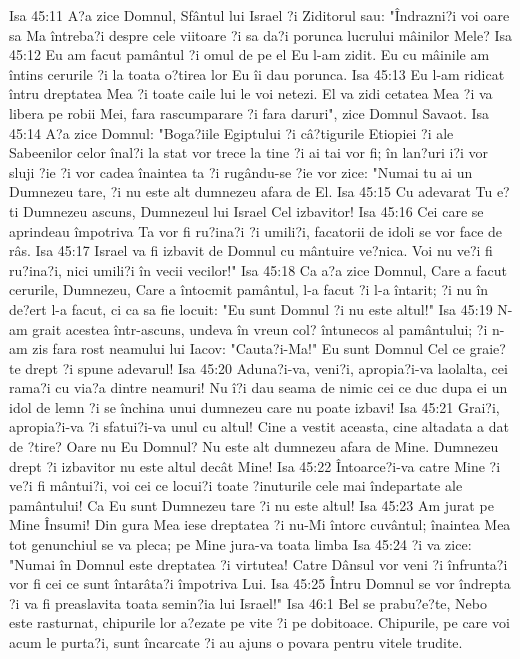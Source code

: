 Isa 45:11  A?a zice Domnul, Sfântul lui Israel ?i Ziditorul sau: "Îndrazni?i voi oare sa Ma întreba?i despre cele viitoare ?i sa da?i porunca lucrului mâinilor Mele?
Isa 45:12  Eu am facut pamântul ?i omul de pe el Eu l-am zidit. Eu cu mâinile am întins cerurile ?i la toata o?tirea lor Eu îi dau porunca.
Isa 45:13  Eu l-am ridicat întru dreptatea Mea ?i toate caile lui le voi netezi. El va zidi cetatea Mea ?i va libera pe robii Mei, fara rascumparare ?i fara daruri", zice Domnul Savaot.
Isa 45:14  A?a zice Domnul: "Boga?iile Egiptului ?i câ?tigurile Etiopiei ?i ale Sabeenilor celor înal?i la stat vor trece la tine ?i ai tai vor fi; în lan?uri i?i vor sluji ?ie ?i vor cadea înaintea ta ?i rugându-se ?ie vor zice: "Numai tu ai un Dumnezeu tare, ?i nu este alt dumnezeu afara de El.
Isa 45:15  Cu adevarat Tu e?ti Dumnezeu ascuns, Dumnezeul lui Israel Cel izbavitor!
Isa 45:16  Cei care se aprindeau împotriva Ta vor fi ru?ina?i ?i umili?i, facatorii de idoli se vor face de râs.
Isa 45:17  Israel va fi izbavit de Domnul cu mântuire ve?nica. Voi nu ve?i fi ru?ina?i, nici umili?i în vecii vecilor!"
Isa 45:18  Ca a?a zice Domnul, Care a facut cerurile, Dumnezeu, Care a întocmit pamântul, l-a facut ?i l-a întarit; ?i nu în de?ert l-a facut, ci ca sa fie locuit: "Eu sunt Domnul ?i nu este altul!"
Isa 45:19  N-am grait acestea într-ascuns, undeva în vreun col? întunecos al pamântului; ?i n-am zis fara rost neamului lui Iacov: "Cauta?i-Ma!" Eu sunt Domnul Cel ce graie?te drept ?i spune adevarul!
Isa 45:20  Aduna?i-va, veni?i, apropia?i-va laolalta, cei rama?i cu via?a dintre neamuri! Nu î?i dau seama de nimic cei ce duc dupa ei un idol de lemn ?i se închina unui dumnezeu care nu poate izbavi!
Isa 45:21  Grai?i, apropia?i-va ?i sfatui?i-va unul cu altul! Cine a vestit aceasta, cine altadata a dat de ?tire? Oare nu Eu Domnul? Nu este alt dumnezeu afara de Mine. Dumnezeu drept ?i izbavitor nu este altul decât Mine!
Isa 45:22  Întoarce?i-va catre Mine ?i ve?i fi mântui?i, voi cei ce locui?i toate ?inuturile cele mai îndepartate ale pamântului! Ca Eu sunt Dumnezeu tare ?i nu este altul!
Isa 45:23  Am jurat pe Mine Însumi! Din gura Mea iese dreptatea ?i nu-Mi întorc cuvântul; înaintea Mea tot genunchiul se va pleca; pe Mine jura-va toata limba
Isa 45:24  ?i va zice: "Numai în Domnul este dreptatea ?i virtutea! Catre Dânsul vor veni ?i înfrunta?i vor fi cei ce sunt întarâta?i împotriva Lui.
Isa 45:25  Întru Domnul se vor îndrepta ?i va fi preaslavita toata semin?ia lui Israel!"
Isa 46:1  Bel se prabu?e?te, Nebo este rasturnat, chipurile lor a?ezate pe vite ?i pe dobitoace. Chipurile, pe care voi acum le purta?i, sunt încarcate ?i au ajuns o povara pentru vitele trudite.
